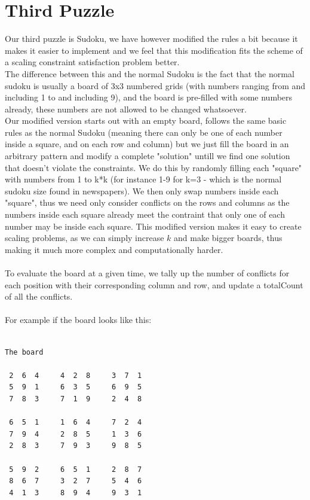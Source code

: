 \documentclass[12pt, a4paper]{article}
\begin{document}
\section{Third Puzzle}
Our third puzzle is Sudoku, we have however modified the rules a bit because it makes it easier to implement and we feel that this modification fits the scheme of a scaling constraint satisfaction problem better.\\
The difference between this and the normal Sudoku is the fact that the normal sudoku is usually a board of 3x3 numbered grids (with numbers ranging from and including 1 to and including 9), and the board is pre-filled with some numbers already, these numbers are not allowed to be changed whatsoever.\\
Our modified version starts out with an empty board, follows the same basic rules as the normal Sudoku (meaning there can only be one of each number inside a square, and on each row and column) but we just fill the board in an arbitrary pattern and modify a complete "solution" untill we find one solution that doesn't violate the constraints. We do this by randomly filling each "square" with numbers from 1 to k*k (for instance 1-9 for k=3 - which is the normal sudoku size found in newspapers). We then only swap numbers inside each "square", thus we need only consider conflicts on the rows and columns as the numbers inside each square already meet the contraint that only one of each number may be inside each square. This modified version makes it easy to create scaling problems, as we can simply increase $k$ and make bigger boards, thus making it much more complex and computationally harder.
\\\\
To evaluate the board at a given time, we tally up the number of conflicts for each position with their corresponding column and row, and update a totalCount of all the conflicts.
\\\\
For example if the board looks like this:

\begin{verbatim}

The board

 2  6  4     4  2  8     3  7  1 
 5  9  1     6  3  5     6  9  5 
 7  8  3     7  1  9     2  4  8 

 6  5  1     1  6  4     7  2  4 
 7  9  4     2  8  5     1  3  6 
 2  8  3     7  9  3     9  8  5 

 5  9  2     6  5  1     2  8  7 
 8  6  7     3  2  7     5  4  6 
 4  1  3     8  9  4     9  3  1 

\end{verbatim}
\end{document}
